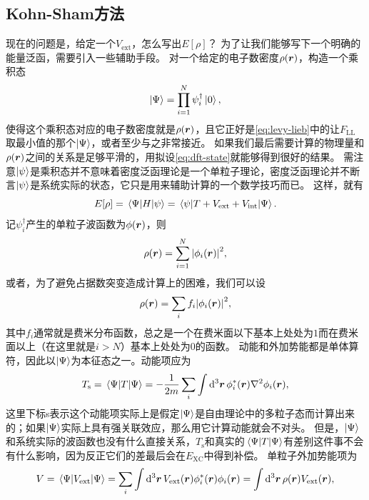 \subsection{Kohn-Sham方法}

现在的问题是，给定一个$V_\text{ext}$，怎么写出$E[\rho]$？
为了让我们能够写下一个明确的能量泛函，需要引入一些辅助手段。
对一个给定的电子数密度$\rho(\vb*{r})$，构造一个乘积态
\begin{equation}
    \ket{\Psi} = \prod_{i=1}^N {\psi}^\dagger_i \ket{0},
    \label{eq:dft-state}
\end{equation}
使得这个乘积态对应的电子数密度就是$\rho(\vb*{r})$，且它正好是\eqref{eq:levy-lieb}中的让$F_\text{LL}$取最小值的那个$\ket{\Psi}$，或者至少与之非常接近。
如果我们最后需要计算的物理量和$\rho(\vb*{r})$之间的关系是足够平滑的，用拟设\eqref{eq:dft-state}就能够得到很好的结果。
需注意$\ket{\psi}$是乘积态并不意味着密度泛函理论是一个单粒子理论，密度泛函理论并不断言$\ket{\psi}$是系统实际的状态，它只是用来辅助计算的一个数学技巧而已。
这样，就有%
\begin{equation}
    E[\rho] = \mel{\Psi}{{H}}{\psi} = \mel{\psi}{{T} + {V}_\text{ext} + {V}_\text{int}}{\Psi}.
\end{equation}
记${\psi}_i^\dagger$产生的单粒子波函数为$\phi(\vb*{r})$，则
\begin{equation}
    \rho(\vb*{r}) = \sum_{i=1}^N \abs{\phi_i(\vb*{r})}^2,
    \label{eq:kohn-sham-density}
\end{equation}
或者，为了避免占据数突变造成计算上的困难，我们可以设
\begin{equation}
    \rho(\vb*{r}) = \sum_i f_i \abs{\phi_i(\vb*{r})}^2,
\end{equation}
其中$f_i$通常就是费米分布函数，总之是一个在费米面以下基本上处处为$1$而在费米面以上（在这里就是$i > N$）基本上处处为$0$的函数。
动能和外加势能都是单体算符，因此以$\ket{\Psi}$为本征态之一。动能项应为
\begin{equation}
    T_\text{s} = \mel{\Psi}{{T}}{\Psi} = - \frac{1}{2m} \sum_i \int \dd[3]{\vb*{r}} \phi_i^*(\vb*{r}) \laplacian \phi_i(\vb*{r}),
\end{equation}
这里下标s表示这个动能项实际上是假定$\ket{\Psi}$是自由理论中的多粒子态而计算出来的；如果$\ket{\Psi}$实际上具有强关联效应，那么用它计算动能就会不对头。
但是，$\ket{\Psi}$和系统实际的波函数也没有什么直接关系，$T_\text{s}$和真实的$\mel*{\Psi}{T}{\Psi}$有差别这件事不会有什么影响，因为反正它们的差最后会在$E_\text{XC}$中得到补偿。
单粒子外加势能项为
\begin{equation}
    V = \mel{\Psi}{{V}_\text{ext}}{\Psi} = \sum_i \int \dd[3]{\vb*{r}} V_{\text{ext}}(\vb*{r}) \phi_i^*(\vb*{r}) \phi_i(\vb*{r}) = \int \dd[3]{\vb*{r}} \rho(\vb*{r}) V_\text{ext}(\vb*{r}),
\end{equation}
